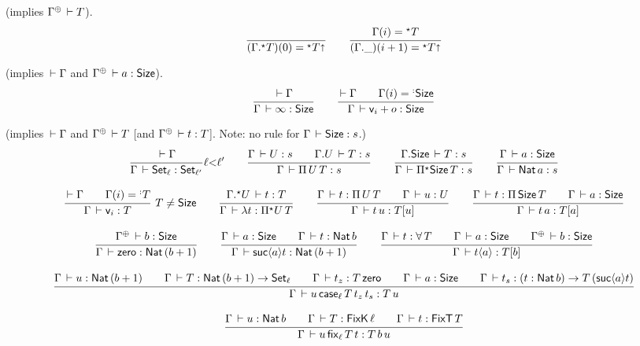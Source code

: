 \documentclass[acmlarge,review,anonymous]{acmart}\settopmatter{printfolios=true}
\begin{document}
 (implies $\resurrect\Gamma \der T$).
\[
  \ru{}{(\eext \Gamma T)(0) = \eann T \slift}
\qquad
  \ru{\Gamma(i) = \eann T
    }{(\cext \Gamma \_)(i+1) = \eann T \slift}
\]

  (implies $\,\vdash \Gamma$ and $\resurrect \Gamma \der a : \Size$).
\[
  \ru{\der \Gamma}{\Gamma \der \infty : \Size}
\qquad
  \ru{\der \Gamma \qquad \Gamma(i) = \erann[\noterased]\Size
    }{\Gamma \der \ind i + o : \Size
    }
\]

  (implies $\,\vdash \Gamma$ and $\resurrect \Gamma \der T$ [and $\resurrect \Gamma \der t : T$]. Note: no rule for $\Gamma \,\vdash \mathsf{Size} : s$.)
\begin{gather*}
  \ru{\der \Gamma
    }{\Gamma \der \Set[\ell] : \Set[\ell']
    }{\ell {<} \ell'}
\qquad
  \ru{\Gamma \der U : s \qquad
      \cext \Gamma U \der T : s
    }{\Gamma \der \piT U T : s}
\qquad
  \ru{\cext \Gamma \Size \der T : s
    }{\Gamma \der \epiT \Size T : s}
\qquad
  \ru{%
      \Gamma \der a : \Size
    }{\Gamma \der \Nat a : s}
\\[2ex]
  \rux{\der \Gamma \qquad \Gamma(i) = \erann[\noterased] T
    }{\Gamma \der \ind i : T
    }{T \not= \Size}
\qquad
  \ru{\eext \Gamma U \der t : T
    }{\Gamma \der \lambda t : \epiT U T}
\qquad
  \ru{\Gamma \der t : \piT U T \qquad
      \Gamma \der u : U
    }{\Gamma \der t\,u : T[u]}
\qquad
  \ru{\Gamma \der t : \piT \Size T \qquad
      \Gamma \der a : \Size
    }{\Gamma \der t\,a : T[a]}
\\[2ex] %
  \ru{\resurrect\Gamma \der b : \Size
    }{\Gamma \der \tzero : \Nat (b + 1)}
\qquad
  \ru{\Gamma \der a : \Size \qquad
      \Gamma \der t : \Nat b
    }{\Gamma \der \suc a t : \Nat (b + 1)}
\qquad
  \ru{\Gamma \der t : \forallT T \qquad
      \Gamma \der a : \Size \qquad
      \resurrect\Gamma \der b : \Size
    }{\Gamma \der t \ann a : T[b]}
\\[2ex]
  \ru{\Gamma \der u : \Nat (b + 1) \qquad
      \Gamma \der T : \Nat (b + 1) \to \Set[\ell] \qquad
      \Gamma \der t_z : T \, \tzero \qquad
      \Gamma \der a : \Size \qquad
      \Gamma \der t_s : (t : \Nat b) \to T \, (\suc a t)
    }{\Gamma \der u\,\case[\ell] T {t_z} t_s : T \, u}
\\[2ex]
  \ru{\Gamma \der u : \Nat b \qquad
      \Gamma \der T : \FixK\,\ell \qquad %
      \Gamma \der t : \FixT\, T
     }{\Gamma \der u\,\fix[\ell] T t : T \,b \, u}
\end{gather*}
\end{document}
